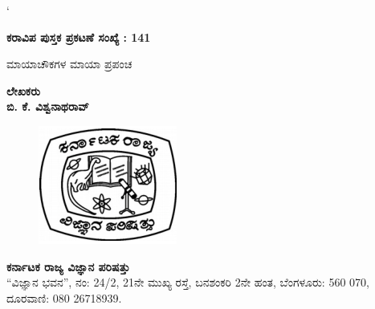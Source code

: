 
`~

\hfill{\bfseries ಕರಾವಿಪ ಪುಸ್ತಕ ಪ್ರಕಟಣೆ ಸಂಖ್ಯೆ : {\rm 141}}

\vfill 

\thispagestyle{empty}
\begin{center}
{\fontsize{30}{32}\selectfont ಮಾಯಾಚೌಕಗಳ ಮಾಯಾ ಪ್ರಪಂಚ}
\vfill


{\Large\bfseries ಲೇಖಕರು}\\[4pt]
{\LARGE\bfseries ಬಿ. ಕೆ. ವಿಶ್ವನಾಥರಾವ್}\\[4pt]
\vfill

\begin{figure}[H]
\centering
\includegraphics[scale=.7]{logo.eps}
\end{figure}

{\Large\bfseries ಕರ್ನಾಟಕ ರಾಜ್ಯ ವಿಜ್ಞಾನ ಪರಿಷತ್ತು}\\
“ವಿಜ್ಞಾನ ಭವನ”, ನಂ: {\rm 24/2}, {\rm 21}ನೇ ಮುಖ್ಯ ರಸ್ತೆ, ಬನಶಂಕರಿ {\rm 2}ನೇ ಹಂತ, ಬೆಂಗಳೂರು: {\rm 560 070},\\
ದೂರವಾಣಿ: {\rm 080 26718939.}

\end{center}
\newpage
